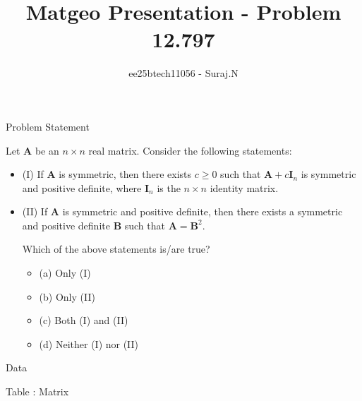 \documentclass{beamer}
\title{Matgeo Presentation - Problem 12.797}
\author{ee25btech11056 - Suraj.N}
\numberwithin{equation}{section}
\theoremstyle{remark}
\let\vec\mathbf
\begin{document}
\begin{frame}
  \titlepage
\end{frame}

\begin{frame}{Problem Statement}

Let $\vec{A}$ be an $n \times n$ real matrix. Consider the following statements:
 
\begin{itemize}

\item (I) If $\vec{A}$ is symmetric, then there exists $c \geq 0$ such that $\vec{A} + c\vec{I}_n$ is symmetric and positive definite, where $\vec{I}_n$ is the $n \times n$ identity matrix.
\item (II) If $\vec{A}$ is symmetric and positive definite, then there exists a symmetric and positive definite $\vec{B}$ such that $\vec{A} = \vec{B}^2$.

Which of the above statements is/are true?

\begin{itemize}
\item (a) Only (I) \\
\item (b) Only (II) \\
\item (c) Both (I) and (II) \\
\item (d) Neither (I) nor (II)
\end{itemize}

\end{itemize}

\end{frame}

\begin{frame}{Data}

\begin{table}[h!]
  \centering
  
  \caption*{Table : Matrix}
  \label{12.797}
\end{table}

\end{frame}
\end{document}
